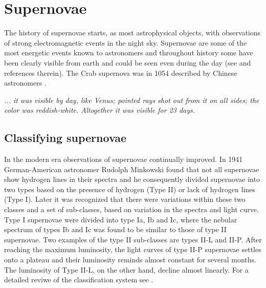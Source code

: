 

\chapter{Supernovae}
The history of supernovae starts, as most astrophysical objects, with observations of strong
electromagnetic events in the night sky. Supernovae are some of the most energetic events
known to astronomers and throughout history some have been clearly visible from earth and could be 
seen even during the day (see \cite{hamacher_14} and references therein). 
The Crab supernova was in 1054 described by Chinese astronomers \citep{ho_96,shen_96}. 
\begin{displayquote}
\textit{... it was visible by day, like Venus; pointed rays shot out
from it on all sides; the color was reddish-white. Altogether it
was visible for 23 days.}
\end{displayquote}
\section{Classifying supernovae}
In the modern era observations of supernovae continually improved. In 1941
German-American astronomer Rudolph Minkowski \citep{minkowski_41} found
that not all supernovae show hydrogen lines in their spectra and
he consequently divided supernovae into two types based on the
presence of hydrogen (Type II) or lack of hydrogen lines (Type I).
Later it was recognized that there were variations within these two classes
and a set of sub-classes, based on variation in the spectra and light curve. 
Type I supernovae were divided into type Ia, Ib and Ic,
where the nebular spectrum of types Ib and Ic was found to be similar to
those of type II supernovae. Two examples of the type II sub-classes are
types II-L and II-P. After reaching the maximum luminosity, the light curves of type II-P supernovae settles onto a
plateau and their luminosity reminds almost constant for several months. The luminosity of Type II-L, on the other hand, 
decline almost linearly. For a detailed reviwe of the classification system see \cite{cappellaro_01}.

